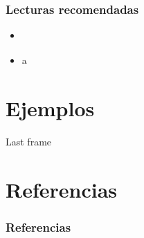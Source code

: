 \documentclass{beamer}
\begin{document}
\begin{frame}
\frametitle{Lecturas recomendadas}

\begin{itemize}
\item \cite{newman2003structure}
\item a
\end{itemize}
\end{frame}

\section{Ejemplos}

\begin{frame}
Last frame
\end{frame}

\section{Referencias}
\begin{frame}
\frametitle{Referencias}


\end{frame}
\end{document}
